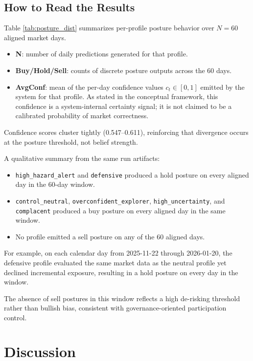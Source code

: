 \documentclass[12pt,a4paper]{report}
\begin{document}
\subsection{How to Read the Results}

Table \ref{tab:posture_dist} summarizes per-profile posture behavior over $N=60$ aligned market days.

\begin{itemize}
	\item \textbf{N}: number of daily predictions generated for that profile.
	\item \textbf{Buy/Hold/Sell}: counts of discrete posture outputs across the 60 days.
	\item \textbf{AvgConf}: mean of the per-day confidence values $c_t \in [0,1]$ emitted by the system for that profile. As stated in the conceptual framework, this confidence is a system-internal certainty signal; it is not claimed to be a calibrated probability of market correctness.
\end{itemize}

Confidence scores cluster tightly (0.547–0.611), reinforcing that divergence occurs at the posture threshold, not belief strength.

A qualitative summary from the same run artifacts:

\begin{itemize}
	\item \texttt{high\_hazard\_alert} and \texttt{defensive} produced a hold posture on every aligned day in the 60-day window.
	\item \texttt{control\_neutral}, \texttt{overconfident\_explorer}, \texttt{high\_uncertainty}, and \texttt{complacent} produced a buy posture on every aligned day in the same window.
	\item No profile emitted a sell posture on any of the 60 aligned days.
\end{itemize}

For example, on each calendar day from 2025-11-22 through 2026-01-20, the defensive profile evaluated the same market data as the neutral profile yet declined incremental exposure, resulting in a hold posture on every day in the window.

The absence of sell postures in this window reflects a high de-risking threshold rather than bullish bias, consistent with governance-oriented participation control.

\section{Discussion}
\end{document}
